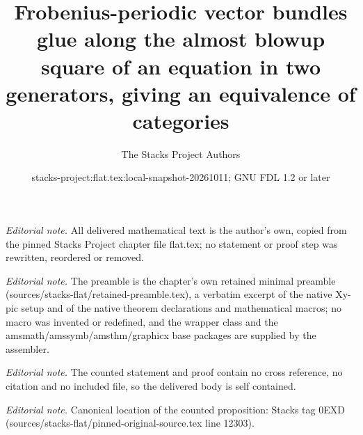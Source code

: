 \documentclass[10pt,a4paper]{amsart}
\title{Frobenius-periodic vector bundles glue along the almost blowup square of an equation in two generators, giving an equivalence of categories}
\author{The Stacks Project Authors}
\date{stacks-project:flat.tex:local-snapshot-20261011; GNU FDL 1.2 or later}
\theoremstyle{plain}
\theoremstyle{definition}
\theoremstyle{remark}
\numberwithin{equation}{subsection}
\begin{document}
\maketitle
\noindent\textit{Editorial note.} All delivered mathematical text is the author's own, copied from the pinned Stacks Project chapter file flat.tex; no statement or proof step was rewritten, reordered or removed.\par\medskip
\noindent\textit{Editorial note.} The preamble is the chapter's own retained minimal preamble (sources/stacks-flat/retained-preamble.tex), a verbatim excerpt of the native Xy-pic setup and of the native theorem declarations and mathematical macros; no macro was invented or redefined, and the wrapper class and the amsmath/amssymb/amsthm/graphicx base packages are supplied by the assembler.\par\medskip
\noindent\textit{Editorial note.} The counted statement and proof contain no cross reference, no citation and no included file, so the delivered body is self contained.\par\medskip
\noindent\textit{Editorial note.} Canonical location of the counted proposition: Stacks tag 0EXD (sources/stacks-flat/pinned-original-source.tex line 12303).\par\medskip
\end{document}

